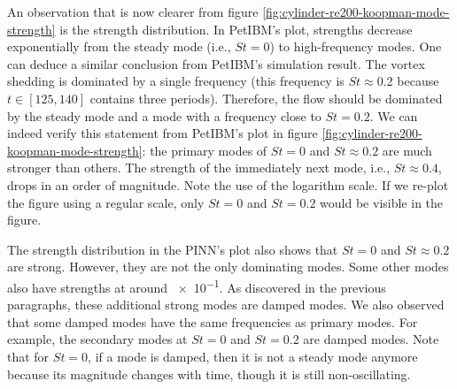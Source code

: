 An observation that is now clearer from figure \ref{fig:cylinder-re200-koopman-mode-strength} is the strength distribution.
In PetIBM's plot, strengths decrease exponentially from the steady mode (i.e., $St=0$) to high-frequency modes.
One can deduce a similar conclusion from PetIBM's simulation result.
The vortex shedding is dominated by a single frequency (this frequency is $St\approx 0.2$ because $t\in[125, 140]$ contains three periods).
Therefore, the flow should be dominated by the steady mode and a mode with a frequency close to $St=0.2$.
We can indeed verify this statement from PetIBM's plot in figure \ref{fig:cylinder-re200-koopman-mode-strength}: the primary modes of $St=0$ and $St\approx 0.2$ are much stronger than others.
The strength of the immediately next mode, i.e., $St\approx 0.4$, drops in an order of magnitude. 
Note the use of the logarithm scale.
If we re-plot the figure using a regular scale, only $St=0$ and $St=0.2$ would be visible in the figure.

The strength distribution in the PINN's plot also shows that $St=0$ and $St\approx 0.2$ are strong.
However, they are not the only dominating modes.  
Some other modes also have strengths at around \num{e-1}.
As discovered in the previous paragraphs, these additional strong modes are damped modes.
We also observed that some damped modes have the same frequencies as primary modes.
For example, the secondary modes at $St=0$ and $St=0.2$ are damped modes.
Note that for $St=0$, if a mode is damped, then it is not a steady mode anymore because its magnitude changes with time, though it is still non-oscillating.

